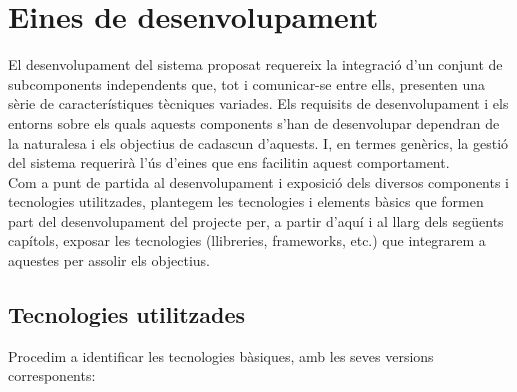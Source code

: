 
\chapter{Eines de desenvolupament} %

\label{EinesDesenvolupament} %

El desenvolupament del sistema proposat requereix la integració d'un conjunt de subcomponents independents que, tot i comunicar-se entre ells, presenten una sèrie de característiques tècniques variades. Els requisits de desenvolupament i els entorns sobre els quals aquests components s'han de desenvolupar dependran de la naturalesa i els objectius de cadascun d'aquests. I, en termes genèrics, la gestió del sistema requerirà l'ús d'eines que ens facilitin aquest comportament.\\

Com a punt de partida al desenvolupament i exposició dels diversos components i tecnologies utilitzades, plantegem les tecnologies i elements bàsics que formen part del desenvolupament del projecte per, a partir d'aquí i al llarg dels següents capítols, exposar les tecnologies (llibreries, frameworks, etc.) que integrarem a aquestes per assolir els objectius.

\section{Tecnologies utilitzades}

Procedim a identificar les tecnologies bàsiques, amb les seves versions corresponents:


